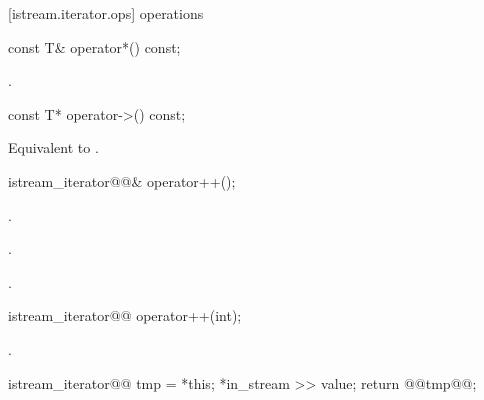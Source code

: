 [istream.iterator.ops]{ operations}

%
%
\begin{itemdecl}
const T& operator*() const;
\end{itemdecl}

\begin{itemdescr}
\pnum
\returns
{}.
\end{itemdescr}

%
%
\begin{itemdecl}
const T* operator->() const;
\end{itemdecl}

\begin{itemdescr}
\pnum
\effects Equivalent to
.
\end{itemdescr}

%
%
\begin{itemdecl}
istream_iterator@@& operator++();
\end{itemdecl}

\begin{itemdescr}
\pnum
\requires {}.

\pnum
\effects
{}.

\pnum
\returns
{}.
\end{itemdescr}

%
%
\begin{itemdecl}
istream_iterator@@ operator++(int);
\end{itemdecl}

\begin{itemdescr}
\pnum
\requires {}.

\pnum
\effects
\begin{codeblock}
istream_iterator@@ tmp = *this;
*in_stream >> value;
return @\removed{(}@tmp@\removed{)}@;
\end{codeblock}
\end{itemdescr}

